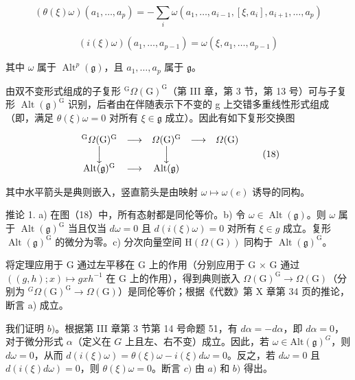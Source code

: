 \[
(\theta (\xi) \omega) (a _ {1}, \dots , a _ {p}) = - \sum_ {i} \omega (a _ {1}, \dots , a _ {i - 1}, [ \xi , a _ {i} ], a _ {i + 1}, \dots , a _ {p})
\]

\[
(i (\xi) \omega) (a _ {1}, \ldots , a _ {p - 1}) = \omega (\xi , a _ {1}, \ldots , a _ {p - 1})
\]

其中 \(\omega\) 属于 \(\operatorname{Alt}^p (\mathfrak{g})\)，且 \(a_1,\ldots ,a_p\) 属于 \(\mathfrak{g}\)。

由双不变形式组成的子复形 \({}^{\mathrm{G}}\varOmega(\mathrm{G})^{\mathrm{G}}\)（第 III 章，第 3 节，第 13 号）可与子复形 \(\operatorname{Alt}(\mathfrak{g})^{\mathrm{G}}\) 识别，后者由在伴随表示下不变的 g 上交错多重线性形式组成（即，满足 \(\theta(\xi)\omega=0\) 对所有 \(\xi\in\mathfrak{g}\) 成立）。因此有如下复形交换图

\[
\begin{array}{c c c c c} ^ {\mathrm{G}} \varOmega (\mathrm{G}) ^ {\mathrm{G}} & \longrightarrow & \varOmega (\mathrm{G}) ^ {\mathrm{G}} & \longrightarrow & \varOmega (\mathrm{G}) \\ \Big \downarrow & & \Big \downarrow & & \\ \operatorname{Alt} (\mathfrak {g}) ^ {\mathrm{G}} & \longrightarrow & \operatorname{Alt} (\mathfrak {g}) & & \end{array}\tag{18}
\]

其中水平箭头是典则嵌入，竖直箭头是由映射 \(\omega\mapsto\omega(e)\) 诱导的同构。

推论 1. a) 在图（18）中，所有态射都是同伦等价。b) 令 \(\omega \in \operatorname{Alt}(\mathfrak{g})\)。则 \(\omega\) 属于 \(\operatorname{Alt}(\mathfrak{g})^{\mathrm{G}}\) 当且仅当 \(d\omega = 0\) 且 \(d(i(\xi)\omega) = 0\) 对所有 \(\xi \in g\) 成立。复形 \(\operatorname{Alt}(\mathfrak{g})^{\mathrm{G}}\) 的微分为零。c) 分次向量空间 \(\mathrm{H}(\Omega(\mathrm{G}))\) 同构于 \(\operatorname{Alt}(\mathfrak{g})^{\mathrm{G}}\)。

将定理应用于 G 通过左平移在 G 上的作用（分别应用于 G × G 通过 \(((g,h);x)\mapsto gxh^{-1}\) 在 G 上的作用），得到典则嵌入 \(\Omega(\mathrm{G})^{\mathrm{G}}\to\Omega(\mathrm{G})\)（分别为 \({}^{G}\Omega(\mathrm{G})^{\mathrm{G}}\to\Omega(\mathrm{G})\)）是同伦等价；根据《代数》第 X 章第 34 页的推论，断言 a) 成立。

我们证明 \(b)\)。根据第 III 章第 3 节第 14 号命题 51，有 \(d\alpha = -d\alpha\)，即 \(d\alpha = 0\)，对于微分形式 \(\alpha\)（定义在 \(G\) 上且左、右不变）成立。因此，若 \(\omega \in \mathrm{Alt}(\mathfrak{g})^G\)，则 \(d\omega = 0\)，从而 \(d(i(\xi)\omega) = \theta(\xi)\omega - i(\xi)d\omega = 0\)。反之，若 \(d\omega = 0\) 且 \(d(i(\xi)d\omega) = 0\)，则 \(\theta(\xi)\omega = 0\)。断言 \(c)\) 由 \(a)\) 和 \(b)\) 得出。

